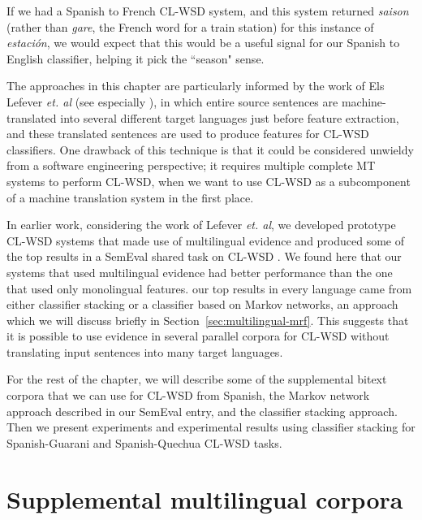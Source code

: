 \label{sent:estacion}

If we had a Spanish to French CL-WSD system, and this system returned
\emph{saison} (rather than \emph{gare}, the French word for a train station)
for this instance of \emph{estación}, we would expect that this would be a
useful signal for our Spanish to English classifier, helping it pick the
``season" sense.

The approaches in this chapter are particularly informed by the work of Els
Lefever \emph{et. al} (see especially
\cite{lefever-hoste-decock:2011:ACL-HLT2011}), in which entire source sentences
are machine-translated into several different target languages just before
feature extraction, and these translated sentences are used to produce features
for CL-WSD classifiers. One drawback of this technique is that it could be
considered unwieldy from a software engineering perspective; it requires
multiple complete MT systems to perform CL-WSD, when we want to use CL-WSD as a
subcomponent of a machine translation system in the first place.

In earlier work, considering the work of Lefever \emph{et. al}, we developed
prototype CL-WSD systems that made use of multilingual evidence
\cite{rudnick-liu-gasser:2013:SemEval-2013} and produced some of the top
results in a SemEval shared task on CL-WSD \cite{task10}.
We found here that our systems that used multilingual evidence had better
performance than
the one that used only monolingual features. our top results in every language
came from either classifier stacking or a classifier based on Markov networks,
an approach which we will discuss briefly in
Section~\ref{sec:multilingual-mrf}. This suggests that it is possible to use
evidence in several parallel corpora for CL-WSD without translating input
sentences into many target languages.

For the rest of the chapter, we will describe some of the supplemental bitext
corpora that we can use for CL-WSD from Spanish, the Markov network approach
described in our SemEval entry, and the classifier stacking approach. Then we
present experiments and experimental results using classifier stacking for
Spanish-Guarani and Spanish-Quechua CL-WSD tasks.

\section{Supplemental multilingual corpora} 

